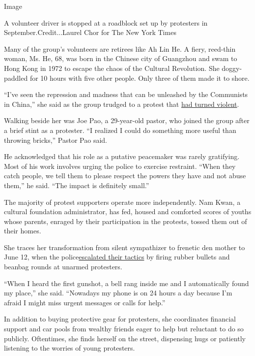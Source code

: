 Image

A volunteer driver is stopped at a roadblock set up by protesters in
September.Credit...Laurel Chor for The New York Times

Many of the group's volunteers are retirees like Ah Lin He. A fiery,
reed-thin woman, Ms. He, 68, was born in the Chinese city of Guangzhou
and swam to Hong Kong in 1972 to escape the chaos of the Cultural
Revolution. She doggy-paddled for 10 hours with five other people. Only
three of them made it to shore.

``I've seen the repression and madness that can be unleashed by the
Communists in China,'' she said as the group trudged to a protest that
\href{https://www.nytimes.com/2019/10/07/world/asia/hong-kong-protesters-masks-violence.html}{had
turned violent}.

Walking beside her was Joe Pao, a 29-year-old pastor, who joined the
group after a brief stint as a protester. ``I realized I could do
something more useful than throwing bricks,'' Pastor Pao said.

He acknowledged that his role as a putative peacemaker was rarely
gratifying. Most of his work involves urging the police to exercise
restraint. ``When they catch people, we tell them to please respect the
powers they have and not abuse them,'' he said. ``The impact is
definitely small.''

The majority of protest supporters operate more independently. Nam Kwan,
a cultural foundation administrator, has fed, housed and comforted
scores of youths whose parents, enraged by their participation in the
protests, tossed them out of their homes.

She traces her transformation from silent sympathizer to frenetic den
mother to June 12, when the
police\href{https://www.nytimes.com/2019/06/12/world/asia/hong-kong-protests.html}{escalated
their tactics} by firing rubber bullets and beanbag rounds at unarmed
protesters.

``When I heard the first gunshot, a bell rang inside me and I
automatically found my place,'' she said. ``Nowadays my phone is on 24
hours a day because I'm afraid I might miss urgent messages or calls for
help.''

In addition to buying protective gear for protesters, she coordinates
financial support and car pools from wealthy friends eager to help but
reluctant to do so publicly. Oftentimes, she finds herself on the
street, dispensing hugs or patiently listening to the worries of young
protesters.


